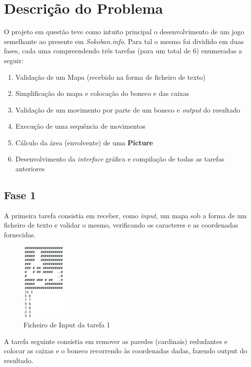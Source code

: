 \documentclass[a4paper]{article}
\begin{document}
\section{Descrição do Problema}
\label{sec:problema}

O projeto em questão teve como intuito principal o desenvolvimento de um jogo semelhante ao presente em \textit{Sokoban.info}. Para tal o mesmo foi dividido em duas fases, cada uma compreendendo três tarefas (para um total de 6) enumeradas a seguir:	 
	\begin{enumerate}
		\item Validação de um Mapa (recebido na forma de ficheiro de texto)
		\item Simplificação do mapa e colocação do boneco e das caixas 
		\item Validação de um movimento por parte de um boneco e \textit{output} do resultado
		\item Execução de uma sequência de movimentos
		\item Cálculo da área (envolvente) de uma \textbf{Picture}
		\item Desenvolvimento da \textit{interface} gráfica e compilação de todas as tarefas anteriores 
	\end{enumerate}

\subsection{Fase 1}
A primeira tarefa consistia em receber, como \textit{input}, um mapa sob a forma de um ficheiro de texto e validar o mesmo, verificando os caracteres e as coordenadas fornecidas.

\begin{figure}[ht]
	\centering
	\includegraphics[width=0.2\textwidth]{assets/mapaExemplo.jpg}  
	\caption{Ficheiro de Input da tarefa 1}
\end{figure}


A tarefa seguinte consistia em remover as paredes (cardinais) redudantes e colocar as caixas e o boneco recorrendo às coordenadas dadas, fazendo output do resultado.
\end{document}
